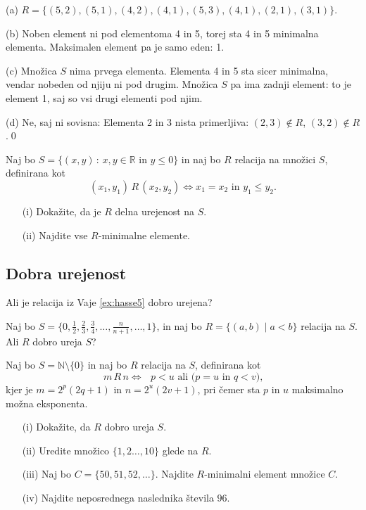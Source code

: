 \documentclass[11pt,paper=b5,footinclude,headinclude]{scrbook} %
\newtheorem{ex}{Vaja\hypertarget{sol:\theex}}[chapter]
\begin{document}
\begin{sol}
    
(a) $R = \{(5,2),(5,1),(4,2),(4,1),(5,3),(4,1),(2,1),(3,1)\}$.

(b) Noben element ni pod elementoma 4 in 5, torej sta 4 in 5 minimalna elementa.
Maksimalen element pa je samo eden: 1.

(c) Množica $S$ nima prvega elementa. Elementa 4 in 5 sta sicer minimalna, vendar nobeden
od njiju ni pod drugim. Množica $S$ pa ima zadnji element: to je element 1, saj so vsi drugi elementi
pod njim.

(d) Ne, saj ni sovisna: Elementa 2 in 3 nista primerljiva: $(2,3)\not\in R$, $(3,2)\not\in R$.\qed
\end{sol}


\begin{ex} Naj bo $S=\{ (x,y) \,:\, x, y\in\mathbb{R} \textrm{ in } y\leq 0 \}$ in naj bo $R$ relacija na množici $S$, definirana kot 
	$$(x_1,y_1)\, R\, (x_2,y_2) \Leftrightarrow  x_1 = x_2 \textrm{ in } y_1\leq y_2.$$
	\begin{enumerate}
		\item[(i)] Dokažite, da je $R$ delna urejenost na $S$.
		\item[(ii)] Najdite vse $R$-minimalne elemente.
	\end{enumerate}
	
	\end{ex} 
    \subsection{Dobra urejenost}
    \begin{ex}
        Ali je relacija iz Vaje \ref{ex:hasse5} dobro urejena? 
    \end{ex}
    \begin{ex} Naj bo $S= \{0,\frac{1}{2}, \frac{2}{3}, \frac{3}{4}, \ldots, \frac{n}{n+1}, \ldots, 1\}$, in naj bo $R=\{(a,b)\mid a<b\}$ relacija na $S$. Ali $R$ dobro ureja $S$?
	
	\end{ex} \begin{ex} Naj bo $S = \mathbb{N}\setminus \{0\}$ in naj bo  $R$ relacija na $S$, definirana kot 
	$$m\, R\, n \Leftrightarrow  \textrm{ $p< u$ ali ($p=u$ in $q < v$),} $$
	kjer je $m=2^p(2q+1)$ in $n=2^u(2v+1)$, pri čemer sta $p$ in $u$ maksimalno možna eksponenta.
	\begin{enumerate}
		\item[(i)] Dokažite, da $R$ dobro ureja $S$.
		\item[(ii)] Uredite množico $\{1,2\ldots, 10\}$ glede na $R$.
		\item[(iii)] Naj bo $C= \{50, 51, 52, \ldots\}$. Najdite $R$-minimalni element množice $C$.
		\item[(iv)] Najdite neposrednega naslednika števila $96$.
	\end{enumerate}
\end{ex}
\end{document}
